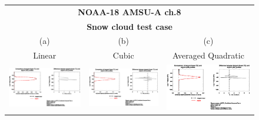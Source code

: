 \begin{figure}[htp]
  \centering
  \begin{tabular}{c c c}
    \multicolumn{3}{c}{\qquad\sffamily\textbf{NOAA-18 AMSU-A ch.8}}\\
    \multicolumn{3}{c}{\qquad\sffamily\textbf{Snow cloud test case}}\\
    \qquad\textsf{(a)} & \qquad\textsf{(b)}  & \qquad\textsf{(c)} \\
    \qquad\textsf{Linear} & \qquad\textsf{Cubic}  & \qquad\textsf{Averaged Quadratic} \\
    \includegraphics[bb=90 400 300 540,clip,scale=0.7]{graphics/Cloud/AD/amsua_n18.ch8.SNOW.NLIN.dOd_dReff.eps} &
    \includegraphics[bb=90 400 300 540,clip,scale=0.7]{graphics/Cloud/AD/amsua_n18.ch8.SNOW.NCUBIC.dOd_dReff.eps} &
    \includegraphics[bb=90 400 300 540,clip,scale=0.7]{graphics/Cloud/AD/amsua_n18.ch8.SNOW.AVGQUAD.dOd_dReff.eps} \\

\end{tabular}
\end{figure}
